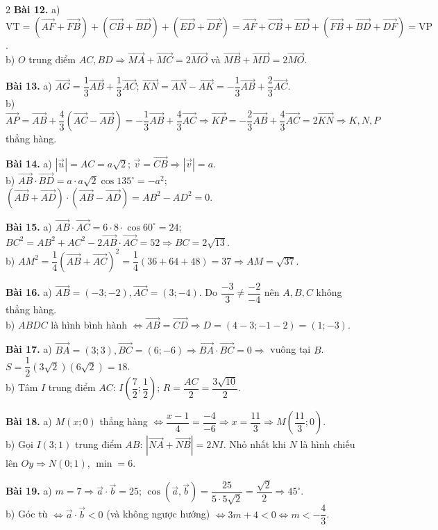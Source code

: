 \documentclass[12pt,a4paper]{article}
\begin{document}
\begin{multicols}{2}
\textbf{Bài 12.} a) $\text{VT} = (\vec{AF} + \vec{FB}) + (\vec{CB} + \vec{BD}) + (\vec{ED} + \vec{DF}) = \vec{AF} + \vec{CB} + \vec{ED} + (\vec{FB} + \vec{BD} + \vec{DF}) = \text{VP}$.\\
b) $O$ trung điểm $AC, BD \Rightarrow \vec{MA} + \vec{MC} = 2\vec{MO}$ và $\vec{MB} + \vec{MD} = 2\vec{MO}$.

\textbf{Bài 13.} a) $\vec{AG} = \dfrac{1}{3}\vec{AB} + \dfrac{1}{3}\vec{AC}$; $\vec{KN} = \vec{AN} - \vec{AK} = -\dfrac{1}{3}\vec{AB} + \dfrac{2}{3}\vec{AC}$.\\
b) $\vec{AP} = \vec{AB} + \dfrac{4}{3}(\vec{AC} - \vec{AB}) = -\dfrac{1}{3}\vec{AB} + \dfrac{4}{3}\vec{AC} \Rightarrow \vec{KP} = -\dfrac{2}{3}\vec{AB} + \dfrac{4}{3}\vec{AC} = 2\vec{KN} \Rightarrow K, N, P$ thẳng hàng.

\textbf{Bài 14.} a) $|\vec{u}| = AC = a\sqrt{2}$; $\vec{v} = \vec{CB} \Rightarrow |\vec{v}| = a$.\\
b) $\vec{AB} \cdot \vec{BD} = a \cdot a\sqrt{2}\cos 135^\circ = -a^2$; $(\vec{AB}+\vec{AD})\cdot(\vec{AB}-\vec{AD}) = AB^2 - AD^2 = 0$.

\textbf{Bài 15.} a) $\vec{AB}\cdot\vec{AC} = 6 \cdot 8 \cdot \cos 60^\circ = 24$; $BC^2 = AB^2 + AC^2 - 2\vec{AB}\cdot\vec{AC} = 52 \Rightarrow BC = 2\sqrt{13}$.\\
b) $AM^2 = \dfrac{1}{4}(\vec{AB}+\vec{AC})^2 = \dfrac{1}{4}(36 + 64 + 48) = 37 \Rightarrow AM = \sqrt{37}$.

\textbf{Bài 16.} a) $\vec{AB} = (-3; -2), \vec{AC} = (3; -4)$. Do $\dfrac{-3}{3} \ne \dfrac{-2}{-4}$ nên $A, B, C$ không thẳng hàng.\\
b) $ABDC$ là hình bình hành $\Leftrightarrow \vec{AB} = \vec{CD} \Rightarrow D = (4 - 3; -1 - 2) = (1; -3)$.

\textbf{Bài 17.} a) $\vec{BA} = (3; 3), \vec{BC} = (6; -6) \Rightarrow \vec{BA}\cdot\vec{BC} = 0 \Rightarrow$ vuông tại $B$. $S = \dfrac{1}{2}(3\sqrt{2})(6\sqrt{2}) = 18$.\\
b) Tâm $I$ trung điểm $AC$: $I\left(\dfrac{7}{2}; \dfrac{1}{2}\right)$; $R = \dfrac{AC}{2} = \dfrac{3\sqrt{10}}{2}$.

\textbf{Bài 18.} a) $M(x; 0)$ thẳng hàng $\Leftrightarrow \dfrac{x - 1}{4} = \dfrac{-4}{-6} \Rightarrow x = \dfrac{11}{3} \Rightarrow M\left(\dfrac{11}{3}; 0\right)$.\\
b) Gọi $I(3; 1)$ trung điểm $AB$: $|\vec{NA} + \vec{NB}| = 2NI$. Nhỏ nhất khi $N$ là hình chiếu lên $Oy \Rightarrow N(0; 1)$, $\min = 6$.

\textbf{Bài 19.} a) $m = 7 \Rightarrow \vec{a}\cdot\vec{b} = 25$; $\cos(\vec{a},\vec{b}) = \dfrac{25}{5 \cdot 5\sqrt{2}} = \dfrac{\sqrt{2}}{2} \Rightarrow 45^\circ$.\\
b) Góc tù $\Leftrightarrow \vec{a}\cdot\vec{b} < 0$ (và không ngược hướng) $\Leftrightarrow 3m + 4 < 0 \Leftrightarrow m < -\dfrac{4}{3}$.


\end{multicols}
\end{document}
